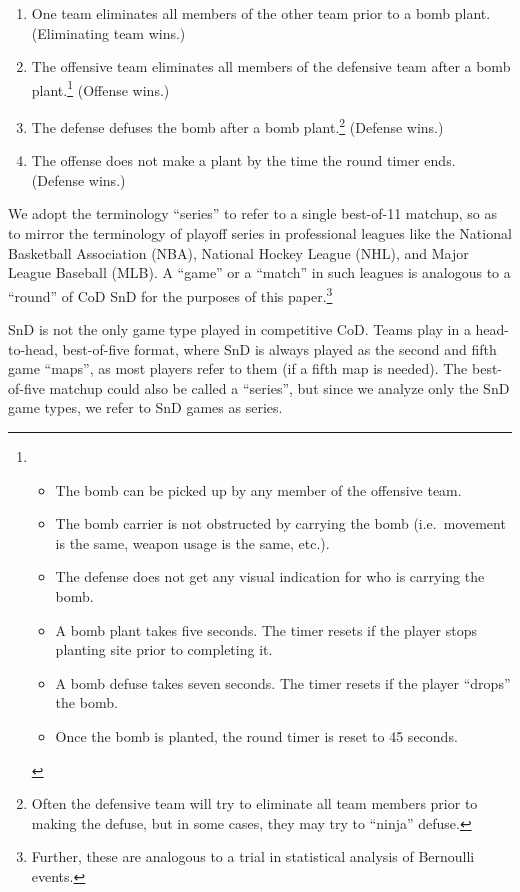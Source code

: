 \documentclass{article}
\providecommand{\tightlist}{%
  \setlength{\itemsep}{0pt}\setlength{\parskip}{0pt}}
\begin{document}
\begin{enumerate}
\def\labelenumi{\arabic{enumi}.}
\tightlist
\item
  One team eliminates all members of the other team prior to a bomb
  plant. (Eliminating team wins.)
\item
  The offensive team eliminates all members of the defensive team after
  a bomb plant.\footnote{\begin{itemize}
    \tightlist
    \item
      The bomb can be picked up by any member of the offensive team.
    \item
      The bomb carrier is not obstructed by carrying the bomb
      (i.e.~movement is the same, weapon usage is the same, etc.).
    \item
      The defense does not get any visual indication for who is carrying
      the bomb.
    \item
      A bomb plant takes five seconds. The timer resets if the player
      stops planting site prior to completing it.
    \item
      A bomb defuse takes seven seconds. The timer resets if the player
      ``drops'' the bomb.
    \item
      Once the bomb is planted, the round timer is reset to 45 seconds.
    \end{itemize}} (Offense wins.)
\item
  The defense defuses the bomb after a bomb plant.\footnote{Often the
    defensive team will try to eliminate all team members prior to
    making the defuse, but in some cases, they may try to ``ninja''
    defuse.} (Defense wins.)
\item
  The offense does not make a plant by the time the round timer ends.
  (Defense wins.)
\end{enumerate}

We adopt the terminology ``series'' to refer to a single best-of-11
matchup, so as to mirror the terminology of playoff series in
professional leagues like the National Basketball Association (NBA),
National Hockey League (NHL), and Major League Baseball (MLB). A
``game'' or a ``match'' in such leagues is analogous to a ``round'' of
CoD SnD for the purposes of this paper.\footnote{Further, these are
  analogous to a trial in statistical analysis of Bernoulli events.}

SnD is not the only game type played in competitive CoD. Teams play in a
head-to-head, best-of-five format, where SnD is always played as the
second and fifth game ``maps'', as most players refer to them (if a
fifth map is needed). The best-of-five matchup could also be called a
``series'', but since we analyze only the SnD game types, we refer to
SnD games as series.
\end{document}
